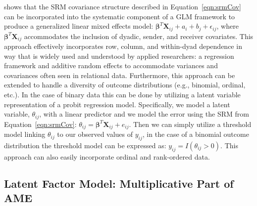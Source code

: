 \citet{hoff:2005} shows that the SRM covariance structure described in Equation~\ref{eqn:srmCov} can be incorporated into the systematic component of a GLM framework to produce a generalized linear mixed effects model: $\bm\beta^{T} \mathbf{X}_{ij} + a_{i} + b_{j} + \epsilon_{ij}$, where $ \bm\beta^{T} \mathbf{X}_{ij}$ accommodates the inclusion of dyadic, sender, and receiver covariates. This approach  effectively incorporates row, column, and within-dyad dependence in way that is widely used and understood by applied researchers: a regression framework and additive random effects to accommodate variances and covariances often seen in relational data. Furthermore, this approach can be extended to handle a diversity of outcome distributions (e.g., binomial, ordinal, etc.). In the case of binary data this can be done by utilizing a latent variable representation of a probit regression model. Specifically, we model a latent variable, $\theta_{ij}$, with a linear predictor and we model the error using the SRM from Equation~\ref{eqn:srmCov}: $\theta_{ij} = \bm\beta^{T} \mathbf{X}_{ij} + e_{ij}$. Then we can simply utilize a threshold model linking $\theta_{ij}$ to our observed values of $y_{ij}$, in the case of a binomial outcome distribution the threshold model can be expressed as: $y_{ij} = I(\theta_{ij}>0)$.  This approach can also easily incorporate ordinal and rank-ordered data.


\subsection{Latent Factor Model: Multiplicative Part of AME}

